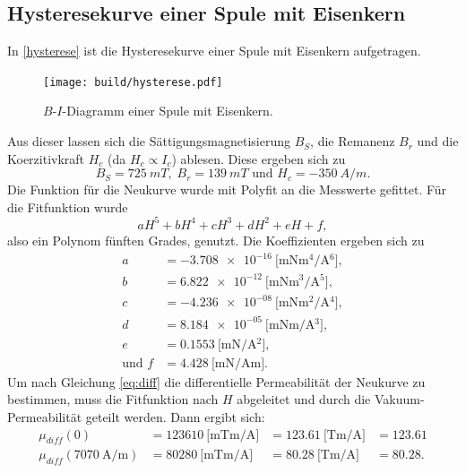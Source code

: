 \subsection{Hysteresekurve einer Spule mit Eisenkern}
In \autoref{hysterese} ist die Hysteresekurve einer Spule mit Eisenkern aufgetragen.
\begin{figure}[H]
    \texttt{[image: build/hysterese.pdf]}
    \caption{$B$-$I$-Diagramm einer Spule mit Eisenkern.}
    \label{hysterese}
\end{figure}
Aus dieser lassen sich die Sättigungsmagnetisierung $B_S$, die Remanenz $B_r$ und
die Koerzitivkraft $H_c$ (da $H_c \propto I_c$) ablesen. Diese ergeben sich zu 
\begin{equation*}
    B_S = \SI{725}{mT},\;B_r = \SI{139}{mT} \text{ und } H_c = \SI{-350}{A/m}.
\end{equation*}
Die Funktion für die Neukurve wurde mit Polyfit \cite{scipy} an die Messwerte gefittet. Für die Fitfunktion wurde 
\begin{equation*}
    aH^5 + bH^4 + cH^3 + dH^2 + eH + f,
\end{equation*}
also ein Polynom fünften Grades, genutzt.
Die Koeffizienten ergeben sich zu
\begin{align*}
    a &= \SI{-3.708e-16}{[\milli\newton\m^4\per\A^6]},\\
    b &= \SI{6.822e-12}{[\milli\newton\m^3\per\A^5]},\\
    c &= \SI{-4.236e-08}{[\milli\newton\m^2\per\A^4]},\\
    d &= \SI{8.184e-05}{[\milli\newton\m\per\A^3]},\\
    e &= \SI{0.1553}{[\milli\newton\per\A^2]},\\
    \text{und }f &= \SI{4.428}{[\milli\newton\per\A\m]}.
\end{align*}
Um nach Gleichung \eqref{eq:diff} die differentielle Permeabilität der Neukurve zu bestimmen, muss die Fitfunktion nach $H$ abgeleitet und durch die Vakuum-Permeabilität 
geteilt werden. Dann ergibt sich:
\begin{align}\label{mudiff}
    \mu_{diff}(0)    &= \SI{123610}{[\milli\tesla\meter\per\ampere]} &= \SI{123.61}{[\tesla\meter\per\ampere]} &= 123.61 \\
    \mu_{diff}(\SI{7070}{\ampere\per\meter}) &= \SI{80280}{[\milli\tesla\meter\per\ampere]} &= \SI{80.28}{[\tesla\meter\per\ampere]} &= 80.28.
\end{align}













\newpage